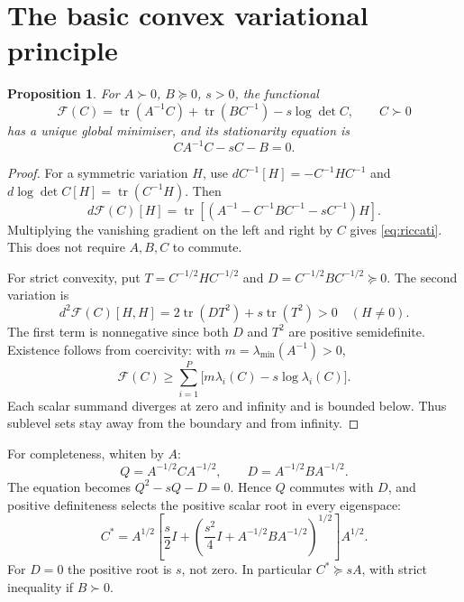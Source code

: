 \documentclass[11pt,a4paper]{article}
\newcommand{\tr}{\operatorname{tr}}
\newcommand{\F}{\mathcal F}
\newtheorem{proposition}{Proposition}
\begin{document}
\section{The basic convex variational principle}
\begin{proposition}
For $A\succ0$, $B\succeq0$, $s>0$, the functional
\begin{equation}\label{eq:F}
 \boxed{\F(C)=\tr(A^{-1}C)+\tr(BC^{-1})-s\log\det C,
 \qquad C\succ0}
\end{equation}
has a unique global minimiser, and its stationarity equation is
\begin{equation}\label{eq:riccati}
 CA^{-1}C-sC-B=0.
\end{equation}
\end{proposition}
\begin{proof}
For a symmetric variation $H$, use
$dC^{-1}[H]=-C^{-1}HC^{-1}$ and $d\log\det C[H]=\tr(C^{-1}H)$.
Then
\begin{equation}
 d\F(C)[H]=\tr\!\left[
 (A^{-1}-C^{-1}BC^{-1}-sC^{-1})H\right].
\end{equation}
Multiplying the vanishing gradient on the left and right by $C$ gives
\eqref{eq:riccati}. This does not require $A,B,C$ to commute.

For strict convexity, put $T=C^{-1/2}HC^{-1/2}$ and
$D=C^{-1/2}BC^{-1/2}\succeq0$. The second variation is
\begin{equation}
 d^2\F(C)[H,H]=2\tr(DT^2)+s\tr(T^2)>0\quad(H\ne0).
\end{equation}
The first term is nonnegative since both $D$ and $T^2$ are positive
semidefinite. Existence follows from coercivity: with
$m=\lambda_{\min}(A^{-1})>0$,
\begin{equation}
 \F(C)\ge\sum_{i=1}^P\bigl[m\lambda_i(C)-s\log\lambda_i(C)\bigr].
\end{equation}
Each scalar summand diverges at zero and infinity and is bounded below.
Thus sublevel sets stay away from the boundary and from infinity.
\end{proof}

For completeness, whiten by $A$:
\begin{equation}
 Q=A^{-1/2}CA^{-1/2},\qquad D=A^{-1/2}BA^{-1/2}.
\end{equation}
The equation becomes $Q^2-sQ-D=0$. Hence $Q$ commutes with $D$, and
positive definiteness selects the positive scalar root in every eigenspace:
\begin{equation}\label{eq:solution}
 \boxed{C^*=A^{1/2}\left[\frac{s}{2}I+
 \left(\frac{s^2}{4}I+A^{-1/2}BA^{-1/2}\right)^{1/2}\right]A^{1/2}.}
\end{equation}
For $D=0$ the positive root is $s$, not zero. In particular
$C^*\succeq sA$, with strict inequality if $B\succ0$.
\end{document}
